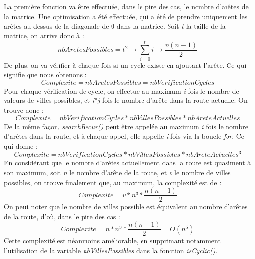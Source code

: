 La première fonction va être effectuée, dans le pire des cas, le nombre d'arêtes de la matrice. Une optimisation a été effectuée, qui a été de prendre uniquement les arêtes au-dessus de la diagonale de 0 dans la matrice. Soit \textit{t} la taille de la matrice, on arrive donc à :
\begin{equation}
nbAretesPossibles = t^2 \rightarrow \overset{t}{\underset{i=0}{\sum}}i \rightarrow \frac{n(n-1)}{2}
\end{equation}
De plus, on va vérifier à chaque fois si un cycle existe en ajoutant l'arête. Ce qui signifie que nous obtenons :
\begin{equation}
Complexite = nbAretesPossibles = nbVerificationCycles
\end{equation}
Pour chaque vérification de cycle, on effectue au maximum \textit{i} fois le nombre de valeurs de villes possibles, et \textit{i}*\textit{j} fois le nombre d'arête dans la route actuelle. On trouve donc :
\begin{equation}
Complexite = nbVerificationCycles * nbVillesPossibles * nbAreteActuelles
\end{equation}
De la même façon, \textit{searchRecur()} peut être appelée au maximum \textit{i} fois le nombre d'arêtes dans la route, et à chaque appel, elle appelle \textit{i} fois via la boucle \textit{for}. Ce qui donne :
\begin{equation}
Complexite = nbVerificationCycles * nbVillesPossibles * nbAreteActuelles^3 
\end{equation}
En considérant que le nombre d'arêtes actuellement dans la route est quasiment à son maximum, soit \textit{n} le nombre d'arête de la route, et \textit{v} le nombre de villes possibles, on trouve finalement que, au maximum, la complexité est de :
\begin{equation}
Complexite = v * n^3 * \frac{n(n-1)}{2}
\end{equation}
On peut noter que le nombre de villes possible est équivalent au nombre d'arêtes de la route, d'où, dans le \underline{pire} des cas :
\begin{equation}
Complexite = n * n^3 * \frac{n(n-1)}{2} = O(n^5)
\end{equation}
Cette complexité est néanmoins améliorable, en supprimant notamment l'utilisation de la variable \textit{nbVillesPossibles} dans la fonction \textit{isCyclic()}.